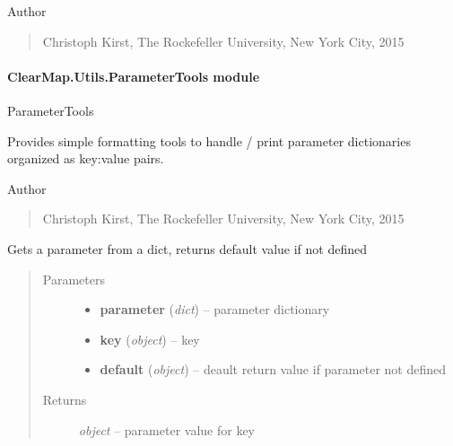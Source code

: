 \documentclass[letterpaper,10pt,english]{sphinxmanual}
\begin{document}
Author
\begin{quote}

Christoph Kirst, The Rockefeller University, New York City, 2015
\end{quote}


\paragraph{ClearMap.Utils.ParameterTools module}
\label{api/ClearMap.Utils:module-ClearMap.Utils.ParameterTools}\label{api/ClearMap.Utils:clearmap-utils-parametertools-module}
ParameterTools

Provides simple formatting tools to handle / print parameter dictionaries
organized as key:value pairs.

Author
\begin{quote}

Christoph Kirst, The Rockefeller University, New York City, 2015
\end{quote}

\begin{fulllineitems}
\label{api/ClearMap.Utils:ClearMap.Utils.ParameterTools.getParameter}
Gets a parameter from a dict, returns default value if not defined
\begin{quote}\begin{description}
\item[{Parameters}] \leavevmode\begin{itemize}
\item {} 
\textbf{parameter} (\emph{dict}) --
parameter dictionary

\item {} 
\textbf{key} (\emph{object}) --
key

\item {} 
\textbf{default} (\emph{object}) --
deault return value if parameter not defined

\end{itemize}

\item[{Returns}] \leavevmode
\emph{object} --
parameter value for key

\end{description}\end{quote}

\end{fulllineitems}
\end{document}
